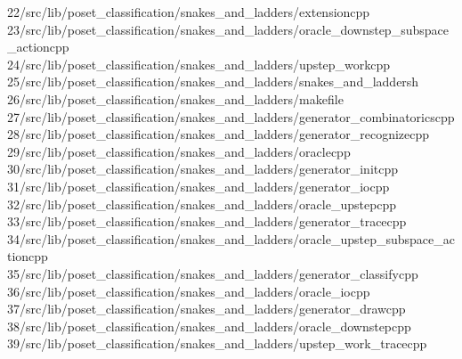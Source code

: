 \begin{tabbing}
22\>/src/lib/poset\_classification/snakes\_and\_ladders/extensioncpp\\[0pt]
23\>/src/lib/poset\_classification/snakes\_and\_ladders/oracle\_downstep\_subspace\_actioncpp\\[0pt]
24\>/src/lib/poset\_classification/snakes\_and\_ladders/upstep\_workcpp\\[0pt]
25\>/src/lib/poset\_classification/snakes\_and\_ladders/snakes\_and\_laddersh\\[0pt]
26\>/src/lib/poset\_classification/snakes\_and\_ladders/makefile\\[0pt]
27\>/src/lib/poset\_classification/snakes\_and\_ladders/generator\_combinatoricscpp\\[0pt]
28\>/src/lib/poset\_classification/snakes\_and\_ladders/generator\_recognizecpp\\[0pt]
29\>/src/lib/poset\_classification/snakes\_and\_ladders/oraclecpp\\[0pt]
30\>/src/lib/poset\_classification/snakes\_and\_ladders/generator\_initcpp\\[0pt]
31\>/src/lib/poset\_classification/snakes\_and\_ladders/generator\_iocpp\\[0pt]
32\>/src/lib/poset\_classification/snakes\_and\_ladders/oracle\_upstepcpp\\[0pt]
33\>/src/lib/poset\_classification/snakes\_and\_ladders/generator\_tracecpp\\[0pt]
34\>/src/lib/poset\_classification/snakes\_and\_ladders/oracle\_upstep\_subspace\_actioncpp\\[0pt]
35\>/src/lib/poset\_classification/snakes\_and\_ladders/generator\_classifycpp\\[0pt]
36\>/src/lib/poset\_classification/snakes\_and\_ladders/oracle\_iocpp\\[0pt]
37\>/src/lib/poset\_classification/snakes\_and\_ladders/generator\_drawcpp\\[0pt]
38\>/src/lib/poset\_classification/snakes\_and\_ladders/oracle\_downstepcpp\\[0pt]
39\>/src/lib/poset\_classification/snakes\_and\_ladders/upstep\_work\_tracecpp\\[0pt]

\end{tabbing}
